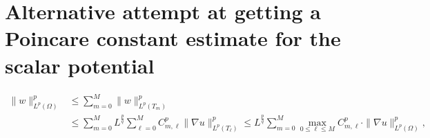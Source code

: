 \documentclass[10pt,a4paper]{article}
\begin{document}
\section{Alternative attempt at getting a Poincare constant estimate for the scalar potential}

\color{green}
    \begin{align*}
        \| w \|_{L^{p}(\Omega)}^{p}
        &
        \leq 
        \sum_{m=0}^{M}
        \| w \|_{L^{p}(T_{m})}^{p}
        \\&
        \leq 
        \sum_{m=0}^{M}
        L^{\frac p q}
        \sum_{\ell=0}^{M} C_{m,\ell}^{p} \| \nabla u \|_{L^{p}(T_{\ell})}^{p} 
        \leq 
        L^{\frac p q}
        \sum_{m=0}^{M} 
        \max_{ 0 \leq \ell \leq M }
        C_{m,\ell}^{p} 
        \cdot 
        \| \nabla u \|_{L^{p}(\Omega)}^{p} 
        ,
    \end{align*}
    
\end{document}
